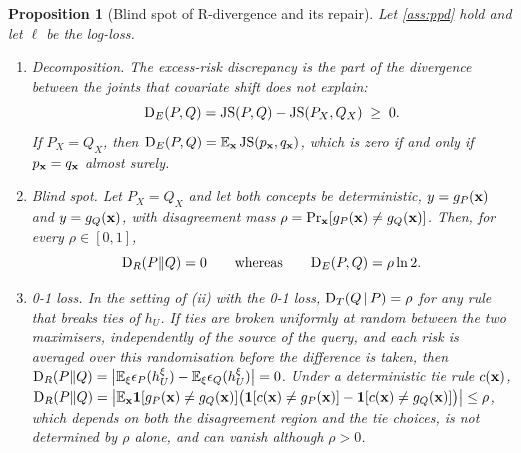 \documentclass[11pt]{article}
\theoremstyle{plain}
\newtheorem{proposition}{Proposition}
\theoremstyle{definition}
\theoremstyle{remark}
\begin{document}
\begin{proposition}[Blind spot of R-divergence and its repair]\label{prop:blind}
Let \cref{ass:ppd} hold and let $\ell$ be the log-loss.
\begin{enumerate}
  \item[(i)] \emph{Decomposition.} The excess-risk discrepancy is the part of the divergence between the joints
  that covariate shift does not explain:
  \[
    \mathrm{D}_E(P,Q)=\mathrm{JS}(P,Q)-\mathrm{JS}(P_X,Q_X)\;\ge\;0 .
  \]
  If $P_X=Q_X$, then $\mathrm{D}_E(P,Q)=\mathbb{E}_{\mathbf{x}}\,\mathrm{JS}(p_{\mathbf{x}},q_{\mathbf{x}})$, which is zero if and only if $p_{\mathbf{x}}=q_{\mathbf{x}}$
  almost surely.
  \item[(ii)] \emph{Blind spot.} Let $P_X=Q_X$ and let both concepts be deterministic, $y=g_P(\mathbf{x})$ and
  $y=g_Q(\mathbf{x})$, with disagreement mass $\rho=\Pr_{\mathbf{x}}[g_P(\mathbf{x})\neq g_Q(\mathbf{x})]$. Then, for every $\rho\in[0,1]$,
  \[
    \mathrm{D}_R(P\|Q)=0\qquad\text{whereas}\qquad \mathrm{D}_E(P,Q)=\rho\ln2 .
  \]
  \item[(iii)] \emph{0-1 loss.} In the setting of (ii) with the 0-1 loss, $\mathrm{D}_T(Q\,|\,P)=\rho$ for any rule that
  breaks ties of $h_U$. If ties are broken uniformly at random between the two maximisers, independently of the source
  of the query, and each risk is averaged over this randomisation before the difference is taken, then
  $\mathrm{D}_R(P\|Q)=\bigl|\mathbb{E}_\xi\epsilon_P(h_U^\xi)-\mathbb{E}_\xi\epsilon_Q(h_U^\xi)\bigr|=0$. Under a deterministic tie rule
  $c(\mathbf{x})$, $\mathrm{D}_R(P\|Q)=\bigl|\mathbb{E}_{\mathbf{x}}\mathbf 1[g_P(\mathbf{x})\ne g_Q(\mathbf{x})]\bigl(\mathbf 1[c(\mathbf{x})\ne g_P(\mathbf{x})]-
  \mathbf 1[c(\mathbf{x})\ne g_Q(\mathbf{x})]\bigr)\bigr|\le\rho$, which depends on both the disagreement region and the tie choices,
  is not determined by $\rho$ alone, and can vanish although $\rho>0$.
\end{enumerate}
\end{proposition}
\end{document}
